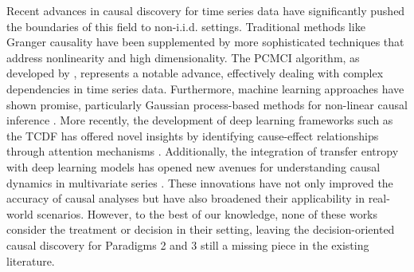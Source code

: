 Recent advances in causal discovery for time series data have significantly pushed the boundaries of this field to non-i.i.d. settings. Traditional methods like Granger causality \citep{Granger1969} have been supplemented by more sophisticated techniques that address nonlinearity and high dimensionality. The PCMCI algorithm, as developed by \cite{Runge2019}, represents a notable advance, effectively dealing with complex dependencies in time series data. Furthermore, machine learning approaches have shown promise, particularly Gaussian process-based methods for non-linear causal inference \citep{LopezPaz2017}. More recently, the development of deep learning frameworks such as the \acrfull{TCDF} has offered novel insights by identifying cause-effect relationships through attention mechanisms \citep{Nauta2019}. Additionally, the integration of transfer entropy with deep learning models has opened new avenues for understanding causal dynamics in multivariate series \citep{Tank2021}. These innovations have not only improved the accuracy of causal analyses but have also broadened their applicability in real-world scenarios. However, to the best of our knowledge, none of these works consider the treatment or decision in their setting, leaving the decision-oriented causal discovery for Paradigms 2 and 3 still a missing piece in the existing literature.





